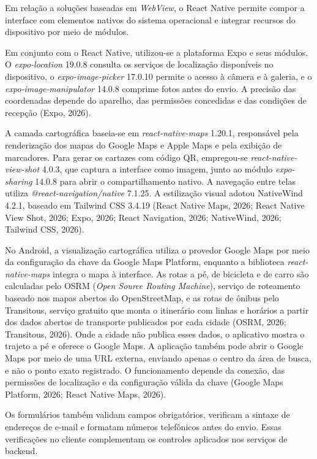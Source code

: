 Em relação a soluções baseadas em \textit{WebView}, o React Native permite compor a interface com elementos nativos do sistema operacional e integrar recursos do dispositivo por meio de módulos.

Em conjunto com o React Native, utilizou-se a plataforma Expo e seus módulos. O \textit{expo-location} 19.0.8 consulta os serviços de localização disponíveis no dispositivo, o \textit{expo-image-picker} 17.0.10 permite o acesso à câmera e à galeria, e o \textit{expo-image-manipulator} 14.0.8 comprime fotos antes do envio. A precisão das coordenadas depende do aparelho, das permissões concedidas e das condições de recepção (Expo, 2026).

A camada cartográfica baseia-se em \textit{react-native-maps} 1.20.1, responsável pela renderização dos mapas do Google Maps e Apple Maps e pela exibição de marcadores. Para gerar os cartazes com código QR, empregou-se \textit{react-native-view-shot} 4.0.3, que captura a interface como imagem, junto ao módulo \textit{expo-sharing} 14.0.8 para abrir o compartilhamento nativo. A navegação entre telas utiliza \textit{@react-navigation/native} 7.1.25. A estilização visual adotou NativeWind 4.2.1, baseado em Tailwind CSS 3.4.19 (React Native Maps, 2026; React Native View Shot, 2026; Expo, 2026; React Navigation, 2026; NativeWind, 2026; Tailwind CSS, 2026).

No Android, a visualização cartográfica utiliza o provedor Google Maps por meio da configuração da chave da Google Maps Platform, enquanto a biblioteca \textit{react-native-maps} integra o mapa à interface. As rotas a pé, de bicicleta e de carro são calculadas pelo OSRM (\textit{Open Source Routing Machine}), serviço de roteamento baseado nos mapas abertos do OpenStreetMap, e as rotas de ônibus pelo Transitous, serviço gratuito que monta o itinerário com linhas e horários a partir dos dados abertos de transporte publicados por cada cidade (OSRM, 2026; Transitous, 2026). Onde a cidade não publica esses dados, o aplicativo mostra o trajeto a pé e oferece o Google Maps. A aplicação também pode abrir o Google Maps por meio de uma URL externa, enviando apenas o centro da área de busca, e não o ponto exato registrado. O funcionamento depende da conexão, das permissões de localização e da configuração válida da chave (Google Maps Platform, 2026; React Native Maps, 2026).

Os formulários também validam campos obrigatórios, verificam a sintaxe de endereços de e-mail e formatam números telefônicos antes do envio. Essas verificações no cliente complementam os controles aplicados nos serviços de backend.

